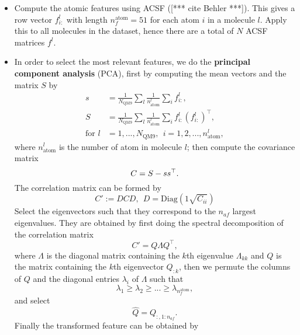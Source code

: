 \documentclass[12pt]{article}
\def\att{                    %
        \marginpar[ \hspace*{\fill} \raisebox{-0.2em}{\rule{2mm}{1.2em}} ]
        {\raisebox{-0.2em}{\rule{2mm}{1.2em}} }
        }
\def\at#1{[*** \att #1 ***]}  %
\begin{document}
\begin{itemize}
	\item Compute the atomic features using ACSF (\at{cite Behler}). This gives a row vector $f^l_{i:}$ with length $n^\text{atom}_f = 51$ for each atom $i$ in a molecule $l$. Apply this to all molecules in the dataset, hence there are a total of $N$ ACSF matrices $f^l$.
	\item In order to select the most relevant features, we do the \textbf{principal component analysis} (PCA), first by computing the mean vectors and the matrix $S$ by
	\begin{equation}
		\begin{split}
			s &= \frac{1}{N_\text{QM9}}\sum_{l} \frac{1}{n^l_\text{atom}}\sum_{i} f^l_{i:}, \\ 
			S &= \frac{1}{N_\text{QM9}}\sum_{l} \frac{1}{n^l_\text{atom}} \sum_{i} f^l_{i:} (f^l_{i:})^\top, \\ 
			\text{for } l &= 1,...,N_\text{QM9}, ~~ i = 1,2,...,n^l_\text{atom},
		\end{split}
	\end{equation}
	where $n^l_\text{atom}$ is the number of atom in molecule $l$; then compute the covariance matrix
	\begin{equation}
		\label{eq:pca_atom_start}
		C = S - ss^\top. \\			
	\end{equation}
	The correlation matrix can be formed by
	\begin{equation}
		C' := DCD, ~~ D = \text{Diag}(1\sqrt{C_{ii}})
	\end{equation}
	Select the eigenvectors such that they correspond to the $n_{af}$ largest eigenvalues. They are obtained by first doing the spectral decomposition of the correlation matrix
	\begin{equation}
		C' = Q\Lambda Q^\top,
	\end{equation}
	where $\Lambda$ is the diagonal matrix containing the $k$th eigenvalue $\Lambda_{kk}$ and $Q$ is the matrix containing the $k$th eigenvector $Q_{:k}$, then we permute the columns of $Q$ and the diagonal entries $\lambda_i$ of $\Lambda$ such that
	\begin{equation}
		\lambda_{1} \geq \lambda_{2} \geq  ... \geq \lambda_{n^\text{atom}_f},
	\end{equation}
	and select
	\begin{equation}
		\hat{Q} = Q_{:, 1:n_{af}}.
	\end{equation}
	Finally the transformed feature can be obtained by

\end{itemize}
\end{document}
